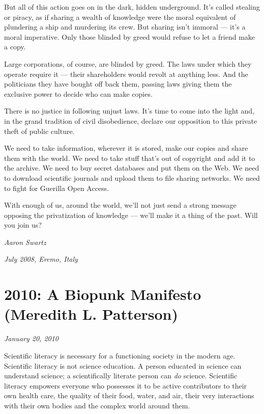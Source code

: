 \documentclass[letterpaper,12pt,english]{sphinxmanual}
\begin{document}
But all of this action goes on in the dark, hidden underground. It's called stealing or piracy, as if sharing a wealth of knowledge were the moral equivalent of plundering a ship and murdering its crew. But sharing isn't immoral — it's a moral imperative. Only those blinded by greed would refuse to let a friend make a copy.

Large corporations, of course, are blinded by greed. The laws under which they operate require it — their shareholders would revolt at anything less. And the politicians they have bought off back them, passing laws giving them the exclusive power to decide who can make copies.

There is no justice in following unjust laws. It's time to come into the light and, in the grand tradition of civil disobedience, declare our opposition to this private theft of public culture.

We need to take information, wherever it is stored, make our copies and share them with the world. We need to take stuff that's out of copyright and add it to the archive. We need to buy secret databases and put them on the Web. We need to download scientific journals and upload them to file sharing networks. We need to fight for Guerilla Open Access.

With enough of us, around the world, we'll not just send a strong message opposing the privatization of knowledge — we'll make it a thing of the past. Will you join us?

\emph{Aaron Swartz}

\emph{July 2008, Eremo, Italy}


\chapter{2010: A Biopunk Manifesto (Meredith L. Patterson)}
\label{2010:a-biopunk-manifesto-meredith-l-patterson}\label{2010::doc}
\emph{January 20, 2010}

Scientific literacy is necessary for a functioning society in the modern age. Scientific literacy is not science education. A person educated in science can understand science; a scientifically literate person can \emph{do} science. Scientific literacy empowers everyone who possesses it to be active contributors to their own health care, the quality of their food, water, and air, their very interactions with their own bodies and the complex world around them.
\end{document}
